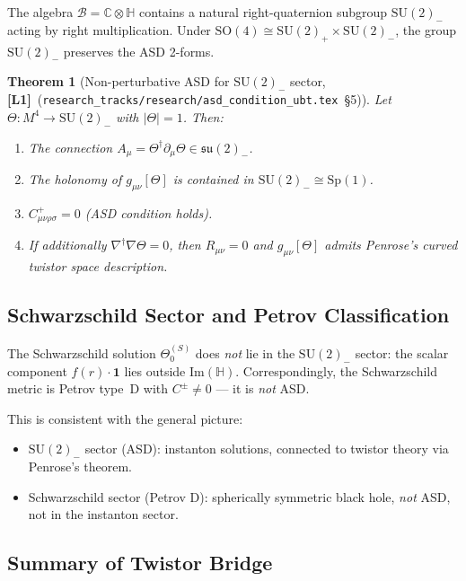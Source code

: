 \documentclass[11pt,a4paper]{article}
\newtheorem{theorem}{Theorem}[section]
\theoremstyle{definition}
\theoremstyle{remark}
\newcommand{\Lone}{\textbf{[L1]}}
\begin{document}
The algebra $\mathcal{B} = \mathbb{C}\otimes\mathbb{H}$ contains a natural
right-quaternion subgroup $\mathrm{SU}(2)_-$ acting by right multiplication.
Under $\mathrm{SO}(4) \cong \mathrm{SU}(2)_+ \times \mathrm{SU}(2)_-$,
the group $\mathrm{SU}(2)_-$ preserves the ASD 2-forms.

\begin{theorem}[Non-perturbative ASD for $\mathrm{SU}(2)_-$ sector, \Lone\ {\normalfont(}\texttt{research\_tracks/research/asd\_condition\_ubt.tex}~§5{\normalfont)}]
\label{thm:asd}
Let $\Theta: M^4 \to \mathrm{SU}(2)_-$ with $|\Theta|=1$.  Then:
\begin{enumerate}
  \item The connection $A_\mu = \Theta^\dagger\partial_\mu\Theta \in
        \mathfrak{su}(2)_-$.
  \item The holonomy of $g_{\mu\nu}[\Theta]$ is contained in
        $\mathrm{SU}(2)_- \cong \mathrm{Sp}(1)$.
  \item $C^+_{\mu\nu\rho\sigma} = 0$ (ASD condition holds).
  \item If additionally $\nabla^\dagger\nabla\Theta = 0$, then
        $R_{\mu\nu} = 0$ and $g_{\mu\nu}[\Theta]$ admits Penrose's
        curved twistor space description.
\end{enumerate}
\end{theorem}

\subsection{Schwarzschild Sector and Petrov Classification}

The Schwarzschild solution $\Theta_0^{(S)}$ does \emph{not} lie in the
$\mathrm{SU}(2)_-$ sector: the scalar component $f(r)\cdot\mathbf{1}$ lies
outside $\mathrm{Im}(\mathbb{H})$.  Correspondingly, the Schwarzschild
metric is Petrov type~D with $C^\pm \neq 0$ — it is \emph{not} ASD.

This is consistent with the general picture:
\begin{itemize}
  \item $\mathrm{SU}(2)_-$ sector (ASD): instanton solutions, connected
        to twistor theory via Penrose's theorem.
  \item Schwarzschild sector (Petrov D): spherically symmetric black hole,
        \emph{not} ASD, not in the instanton sector.
\end{itemize}

\subsection{Summary of Twistor Bridge}
\end{document}
